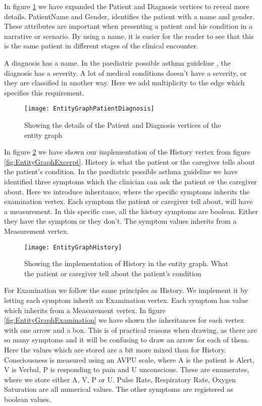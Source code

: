 In figure \ref{fig:EntityGraphPatientDiagnosis} we have expanded the Patient and Diagnosis vertices to reveal more details. PatientName and Gender, identifies the patient with a name and gender. These attributes are important when presenting a patient and his condition in a narrative or scenario. By using a name, it is easier for the reader to see that this is the same patient in different stages of the clinical encounter.

A diagnosis has a name. In the paediatric possible asthma guideline \parencite{RepublicofKeny2016}, the diagnosis has a severity. A lot of medical conditions doesn't have a severity, or they are classified in another way. Here we add multiplicity to the edge which specifies this requirement. 
\begin{figure}[h!]
	\caption {Showing the details of the Patient and Diagnosis vertices of the entity graph}
	\label{fig:EntityGraphPatientDiagnosis}
	\texttt{[image: EntityGraphPatientDiagnosis]}
\end{figure}

In figure \ref{fig:EntityGraphHistory} we have shown our implementation of the History vertex from figure \ref{fig:EntityGraphExcerpt}. History is what the patient or the caregiver tells about the patient's condition. In the paediatric possible asthma guideline \parencite{RepublicofKeny2016} we have identified three symptoms which the clinician can ask the patient or the caregiver about. Here we introduce inheritance, where the specific symptoms inherits the examination vertex. Each symptom the patient or caregiver tell about, will have a measurement. In this specific case, all the history symptoms are boolean. Either they have the symptom or they don't. The symptom values inherits from a Measurement vertex.

\begin{figure}[h!]
	\caption {Showing the implementation of History in the entity graph. What the patient or caregiver tell about the patient's condition}
	\label{fig:EntityGraphHistory}
	\texttt{[image: EntityGraphHistory]}
\end{figure}

For Examination we follow the same principles as History. We implement it by letting each symptom inherit an Examination vertex. Each symptom has value which inherits from a Measurement vertex. In figure \ref{fig:EntityGraphExamination} we have shown the inheritances for each vertex with one arrow and a box. This is of practical reasons when drawing, as there are so many symptoms and it will be confusing to draw an arrow for each of them. Here the values which are stored are a bit more mixed than for History. Consciousness is measured using an AVPU scale, where A is the patient is Alert, V is Verbal, P is responding to pain and U unconscious. These are enumerates, where we store either A, V, P or U. Pulse Rate, Respiratory Rate, Oxygen Saturation are all numerical values. The other symptoms are registered as boolean values.


